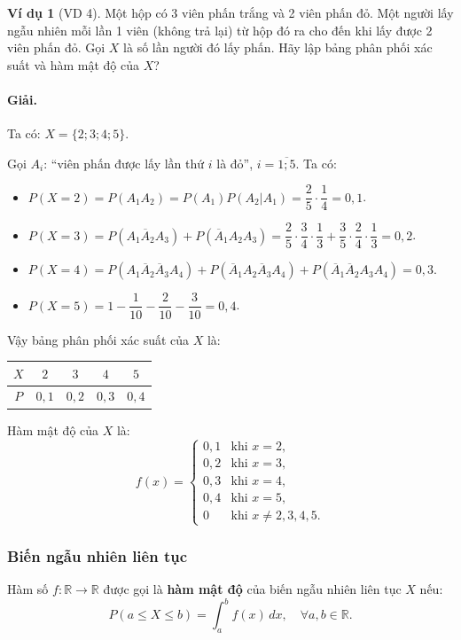 \documentclass[12pt,a4paper]{article}
\theoremstyle{definition}
\newtheorem{vidu}{Ví dụ}[section]
\begin{document}
\begin{vidu}[VD 4]
Một hộp có 3 viên phấn trắng và 2 viên phấn đỏ. Một người lấy ngẫu nhiên mỗi lần 1 viên (không trả lại) từ hộp đó ra cho đến khi lấy được 2 viên phấn đỏ. Gọi $X$ là số lần người đó lấy phấn. Hãy lập bảng phân phối xác suất và hàm mật độ của $X$?

\paragraph{Giải.} Ta có: $X = \{2; 3; 4; 5\}$.

Gọi $A_i$: ``viên phấn được lấy lần thứ $i$ là đỏ'', $i = \overline{1; 5}$.
Ta có:
\begin{itemize}
    \item $P(X = 2) = P(A_1 A_2) = P(A_1) P(A_2 | A_1) = \dfrac{2}{5} \cdot \dfrac{1}{4} = 0{,}1$.
    \item $P(X = 3) = P(A_1 \overline{A}_2 A_3) + P(\overline{A}_1 A_2 A_3) = \dfrac{2}{5} \cdot \dfrac{3}{4} \cdot \dfrac{1}{3} + \dfrac{3}{5} \cdot \dfrac{2}{4} \cdot \dfrac{1}{3} = 0{,}2$.
    \item $P(X = 4) = P(A_1 \overline{A}_2 \overline{A}_3 A_4) + P(\overline{A}_1 A_2 \overline{A}_3 A_4) + P(\overline{A}_1 \overline{A}_2 A_3 A_4) = 0{,}3$.
    \item $P(X = 5) = 1 - \dfrac{1}{10} - \dfrac{2}{10} - \dfrac{3}{10} = 0{,}4$.
\end{itemize}

Vậy bảng phân phối xác suất của $X$ là:
\begin{center}
\begin{tabular}{|c|c|c|c|c|}
\hline
$X$ & $2$ & $3$ & $4$ & $5$ \\
\hline
$P$ & $0{,}1$ & $0{,}2$ & $0{,}3$ & $0{,}4$ \\
\hline
\end{tabular}
\end{center}

Hàm mật độ của $X$ là:
\[
f(x) = \begin{cases}
0{,}1 & \text{khi } x = 2, \\
0{,}2 & \text{khi } x = 3, \\
0{,}3 & \text{khi } x = 4, \\
0{,}4 & \text{khi } x = 5, \\
0 & \text{khi } x \ne 2, 3, 4, 5.
\end{cases}
\]
\end{vidu}

\subsubsection{Biến ngẫu nhiên liên tục}
Hàm số $f: \mathbb{R} \to \mathbb{R}$ được gọi là \textbf{hàm mật độ} của biến ngẫu nhiên liên tục $X$ nếu:
\[
P(a \le X \le b) = \int_a^b f(x)\,dx, \quad \forall a, b \in \mathbb{R}.
\]
\end{document}

